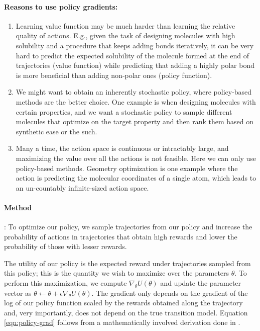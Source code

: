 \paragraph{Reasons to use policy gradients:}
\begin{enumerate}
    \item Learning value function may be much harder than learning the relative quality of actions. E.g., given the task of designing molecules with high solubility and a procedure that keeps adding bonds iteratively, it can be very hard to predict the expected solubility of the molecule formed at the end of trajectories (value function) while predicting that adding a highly polar bond is more beneficial than adding non-polar ones (policy function).
    \item We might want to obtain an inherently stochastic policy, where policy-based methods are the better choice. One example is when designing molecules with certain properties, and we want a stochastic policy to sample different molecules that optimize on the target property and then rank them based on synthetic ease or the such.
    \item Many a time, the action space is continuous or intractably large, and maximizing the value over all the actions is not feasible. Here we can only use policy-based methods. Geometry optimization is one example where the action is predicting the molecular coordinates of a single atom, which leads to an un-countably infinite-sized action space.
\end{enumerate}

\paragraph{Method}:
To optimize our policy, we sample trajectories from our policy and increase the probability of actions in trajectories that obtain high rewards and lower the probability of those with lesser rewards.

The utility of our policy is the expected reward under trajectories sampled from this policy; this is the quantity we wish to maximize over the parameters $\theta$. To perform this maximization, we compute $\nabla_\theta U(\theta)$ and update the parameter vector as $\theta \leftarrow \theta + \epsilon \nabla_\theta U(\theta)$. The gradient only depends on the gradient of the log of our policy function scaled by the rewards obtained along the trajectory and, very importantly, does not depend on the true transition model. Equation \ref{eqn:policy-grad} follows from a mathematically involved derivation done in \cite{}.

